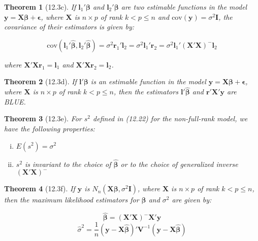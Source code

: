 \documentclass{article}
\newtheorem{theorem}{Theorem}[section]
\begin{document}
\begin{theorem}[12.3c]
If $\mathbf{l}_1'\boldsymbol{\beta}$ and $\mathbf{l}_2'\boldsymbol{\beta}$ are two estimable functions in the model $\mathbf{y} = \mathbf{X}\boldsymbol{\beta} + \boldsymbol{\epsilon}$, where $\mathbf{X}$ is $n \times p$ of rank $k < p \leq n$ and $\text{cov}(\mathbf{y}) = \sigma^2\mathbf{I}$, the covariance of their estimators is given by:

\[\text{cov}(\mathbf{l}_1'\hat{\boldsymbol{\beta}}, \mathbf{l}_2'\hat{\boldsymbol{\beta}}) = \sigma^2\mathbf{r}_1'\mathbf{l}_2 = \sigma^2\mathbf{l}_1'\mathbf{r}_2 = \sigma^2\mathbf{l}_1'(\mathbf{X}'\mathbf{X})^{-}\mathbf{l}_2\]

where $\mathbf{X}'\mathbf{X}\mathbf{r}_1 = \mathbf{l}_1$ and $\mathbf{X}'\mathbf{X}\mathbf{r}_2 = \mathbf{l}_2$.
\end{theorem}

\begin{theorem}[12.3d]
If $\mathbf{l}'\boldsymbol{\beta}$ is an estimable function in the model $\mathbf{y} = \mathbf{X}\boldsymbol{\beta} + \boldsymbol{\epsilon}$, where $\mathbf{X}$ is $n \times p$ of rank $k < p \leq n$, then the estimators $\mathbf{l}'\hat{\boldsymbol{\beta}}$ and $\mathbf{r}'\mathbf{X}'\mathbf{y}$ are BLUE.
\end{theorem}

\begin{theorem}[12.3e]
For $s^2$ defined in (12.22) for the non-full-rank model, we have the following properties:

\begin{enumerate}[(i)]
\item $E(s^2) = \sigma^2$
\item $s^2$ is invariant to the choice of $\hat{\boldsymbol{\beta}}$ or to the choice of generalized inverse $(\mathbf{X}'\mathbf{X})^{-}$
\end{enumerate}
\end{theorem}

\begin{theorem}[12.3f]
If $\mathbf{y}$ is $N_n(\mathbf{X}\boldsymbol{\beta}, \sigma^2\mathbf{I})$, where $\mathbf{X}$ is $n \times p$ of rank $k < p \leq n$, then the maximum likelihood estimators for $\boldsymbol{\beta}$ and $\sigma^2$ are given by:

\[\hat{\boldsymbol{\beta}} = (\mathbf{X}'\mathbf{X})^{-}\mathbf{X}'\mathbf{y}\]
\[\hat{\sigma}^2 = \frac{1}{n}(\mathbf{y} - \mathbf{X}\hat{\boldsymbol{\beta}})'\mathbf{V}^{-1}(\mathbf{y} - \mathbf{X}\hat{\boldsymbol{\beta}})\]
\end{theorem}
\end{document}
